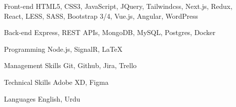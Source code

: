 

\begin{cvskills}

  \cvskill
    {Front-end} %
    {HTML5, CSS3, JavaScript, JQuery, Tailwindcss, Next.js, Redux, React, LESS, SASS, Bootstrap 3/4, Vue.js, Angular, WordPress} %

  \cvskill
    {Back-end} %
    {Express, REST APIs, MongoDB, MySQL, Postgres, Docker } %

  \cvskill
    {Programming} %
    {Node.js, SignalR, LaTeX} %

  \cvskill
    {Management Skills} %
    {Git, Github, Jira, Trello} %

  \cvskill
    {Technical Skills} %
    {Adobe XD, Figma} %

  \cvskill
    {Languages} %
    {English, Urdu} %

\end{cvskills}
